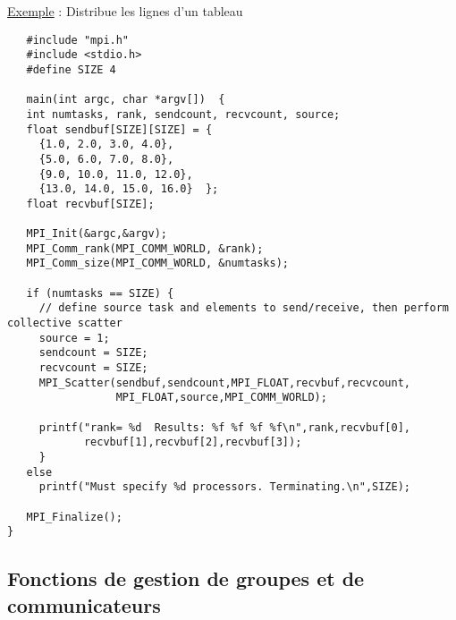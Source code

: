\documentclass[11pt,a4paper]{article}
\begin{document}
\begin{itemize}
\begin{center}
\end{center}


\end{itemize}

\underline{Exemple} : Distribue les lignes d'un tableau 

\begin{lstlisting}
   #include "mpi.h"
   #include <stdio.h>
   #define SIZE 4

   main(int argc, char *argv[])  {
   int numtasks, rank, sendcount, recvcount, source;
   float sendbuf[SIZE][SIZE] = {
     {1.0, 2.0, 3.0, 4.0},
     {5.0, 6.0, 7.0, 8.0},
     {9.0, 10.0, 11.0, 12.0},
     {13.0, 14.0, 15.0, 16.0}  };
   float recvbuf[SIZE];

   MPI_Init(&argc,&argv);
   MPI_Comm_rank(MPI_COMM_WORLD, &rank);
   MPI_Comm_size(MPI_COMM_WORLD, &numtasks);

   if (numtasks == SIZE) {
     // define source task and elements to send/receive, then perform collective scatter
     source = 1;
     sendcount = SIZE;
     recvcount = SIZE;
     MPI_Scatter(sendbuf,sendcount,MPI_FLOAT,recvbuf,recvcount,
                 MPI_FLOAT,source,MPI_COMM_WORLD);

     printf("rank= %d  Results: %f %f %f %f\n",rank,recvbuf[0],
            recvbuf[1],recvbuf[2],recvbuf[3]);
     }
   else
     printf("Must specify %d processors. Terminating.\n",SIZE);

   MPI_Finalize();
}
\end{lstlisting}

\subsection{Fonctions de gestion de groupes et de communicateurs}
\end{document}
